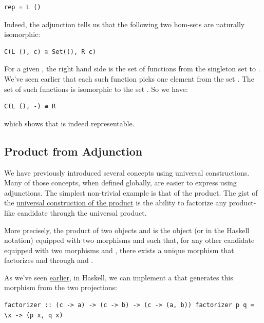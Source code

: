 \begin{verbatim}
rep = L ()
\end{verbatim}

Indeed, the adjunction tells us that the following two hom-sets are
naturally isomorphic:

\begin{verbatim}
C(L (), c) ≅ Set((), R c)
\end{verbatim}

For a given , the right hand side is the set of functions from
the singleton set \code{()} to . We've seen earlier that
each such function picks one element from the set . The set
of such functions is isomorphic to the set . So we have:

\begin{verbatim}
C(L (), -) ≅ R
\end{verbatim}

which shows that  is indeed representable.

\subsection{Product from Adjunction}\label{product-from-adjunction}

We have previously introduced several concepts using universal
constructions. Many of those concepts, when defined globally, are easier
to express using adjunctions. The simplest non-trivial example is that
of the product. The gist of the
\href{https://bartoszmilewski.com/2015/01/07/products-and-coproducts/}{universal
construction of the product} is the ability to factorize any
product-like candidate through the universal product.

More precisely, the product of two objects  and  is
the object  (or  in the Haskell
notation) equipped with two morphisms  and  such
that, for any other candidate  equipped with two morphisms
 and , there
exists a unique morphism  that
factorizes  and  through  and
.

As we've seen
\href{https://bartoszmilewski.com/2015/01/07/products-and-coproducts/}{earlier},
in Haskell, we can implement a  that generates this
morphism from the two projections:

\begin{verbatim}
factorizer :: (c -> a) -> (c -> b) -> (c -> (a, b)) factorizer p q = \x -> (p x, q x)
\end{verbatim}

